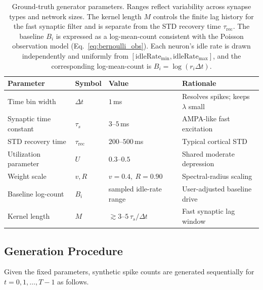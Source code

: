 \documentclass[11pt]{article}
\begin{document}
\begin{table}[h]
\centering
\small
\setlength{\tabcolsep}{3pt}
\begin{tabular}{@{}llll@{}}
\toprule
Parameter & Symbol & Value & Rationale \\
\midrule
Time bin width         & $\Delta t$            & $1$\,ms                           & Resolves spikes; keeps $\lambda$ small \\
Synaptic time constant & $\tau_s$              & $3$--$5$\,ms                      & AMPA-like fast excitation \\
STD recovery time      & $\tau_{\mathrm{rec}}$ & $200$--$500$\,ms                  & Typical cortical STD \\
Utilization parameter  & $U$                   & $0.3$--$0.5$                      & Shared moderate depression \\
Weight scale           & $v, R$                & $v=0.4,\ R=0.90$                  & Spectral-radius scaling \\
Baseline log-count     & $B_i$                 & sampled idle-rate range           & User-adjusted baseline drive \\
Kernel length          & $M$                   & $\gtrsim 3$--$5\,\tau_s/\Delta t$ & Fast synaptic lag window \\
\bottomrule
\end{tabular}
\caption{Ground-truth generator parameters. Ranges reflect variability across
synapse types and network sizes. The kernel length $M$ controls the finite lag
history for the fast synaptic filter and is separate from the STD recovery time
$\tau_{\mathrm{rec}}$. The baseline $B_i$ is expressed as a log-mean-count consistent
with the Poisson observation model (Eq.~\ref{eq:bernoulli_obs}).
Each neuron's idle rate is drawn independently and uniformly from
$[\text{idleRate}_{\min}, \text{idleRate}_{\max}]$, and the corresponding
log-mean-count is $B_i = \log(r_i\Delta t)$.}
\label{tab:gen_params}
\end{table}

\subsection{Generation Procedure}
\label{sec:gen_procedure}

Given the fixed parameters, synthetic spike counts are generated sequentially
for $t = 0, 1, \dots, T-1$ as follows.
\end{document}
